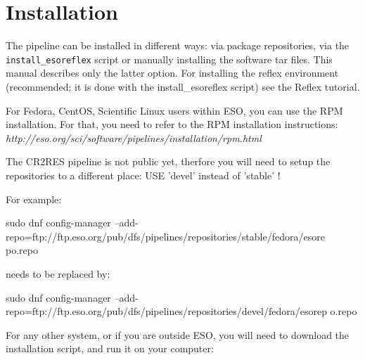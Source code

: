 \section{Installation}
\label{sec:installation}
\label{sec:install-howto}

The \instrument{} pipeline can be installed in different ways: via package
repositories, via the \texttt{install_esoreflex} script or manually installing the
software tar files. This manual describes only the latter option. For
installing the reflex environment (recommended; it is done with the
install_esoreflex script) see the \instrument{} Reflex tutorial.

For Fedora, CentOS, Scientific Linux users within ESO, you can use the RPM
installation.
For that, you need to refer to the RPM installation instructions:
{\it http://eso.org/sci/software/pipelines/installation/rpm.html}

The CR2RES pipeline is not public yet, therfore you will need to setup the
repositories to a different place:
USE 'devel' instead of 'stable' !

For example:

sudo dnf config-manager
--add-repo=ftp://ftp.eso.org/pub/dfs/pipelines/repositories/stable/fedora/esore
po.repo

needs to be replaced by:

sudo dnf config-manager
--add-repo=ftp://ftp.eso.org/pub/dfs/pipelines/repositories/devel/fedora/esorep
o.repo

For any other system, or if you are outside ESO, you will need to download the
installation script, and run it on your computer:

